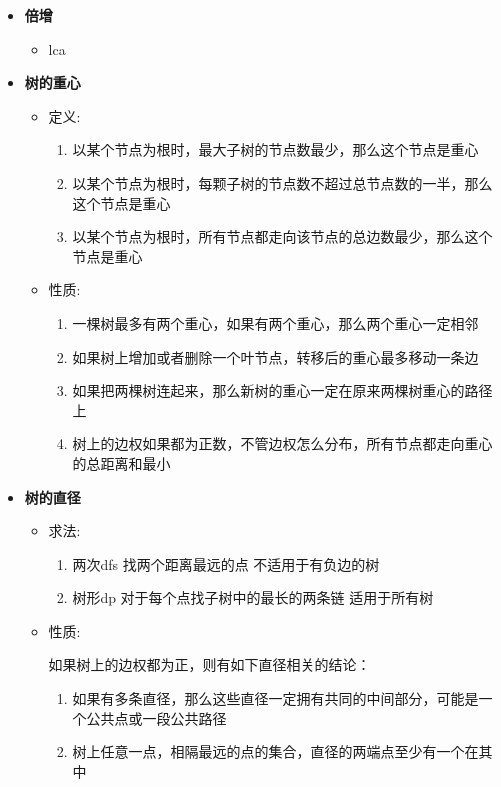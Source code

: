 \begin{itemize}
    \item \textbf{倍增}
    \begin{itemize}
        \item lca
    \end{itemize}
    
    \item \textbf{树的重心}
    \begin{itemize}
        \item 定义:
        \begin{enumerate}
            \item 以某个节点为根时，最大子树的节点数最少，那么这个节点是重心
            \item 以某个节点为根时，每颗子树的节点数不超过总节点数的一半，那么这个节点是重心
            \item 以某个节点为根时，所有节点都走向该节点的总边数最少，那么这个节点是重心
        \end{enumerate}
        \item 性质:
        \begin{enumerate}
            \item 一棵树最多有两个重心，如果有两个重心，那么两个重心一定相邻
            \item 如果树上增加或者删除一个叶节点，转移后的重心最多移动一条边
            \item 如果把两棵树连起来，那么新树的重心一定在原来两棵树重心的路径上
            \item 树上的边权如果都为正数，不管边权怎么分布，所有节点都走向重心的总距离和最小
        \end{enumerate}
    \end{itemize}
    
    \item \textbf{树的直径}
    \begin{itemize}
        \item 求法: 
        \begin{enumerate}
            \item 两次dfs 找两个距离最远的点 不适用于有负边的树
            \item 树形dp 对于每个点找子树中的最长的两条链 适用于所有树
        \end{enumerate}
        \item 性质:
        
        如果树上的边权都为正，则有如下直径相关的结论：
        \begin{enumerate}
            \item 如果有多条直径，那么这些直径一定拥有共同的中间部分，可能是一个公共点或一段公共路径
            \item 树上任意一点，相隔最远的点的集合，直径的两端点至少有一个在其中
        \end{enumerate}
    \end{itemize}
    

\end{itemize}
